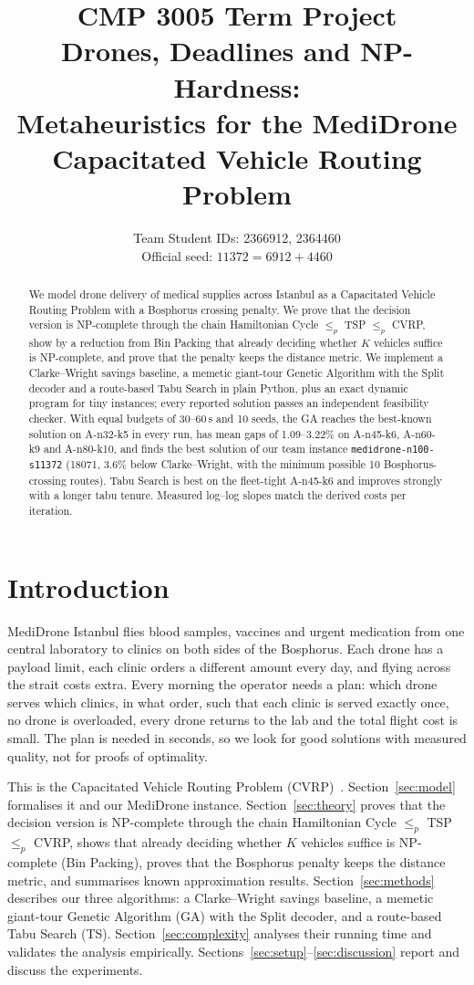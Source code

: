 \documentclass[11pt,a4paper]{article}
\title{CMP 3005 Term Project\\[2pt]
\large Drones, Deadlines and NP-Hardness:\\ Metaheuristics for the MediDrone Capacitated Vehicle Routing Problem}
\author{Team Student IDs: 2366912, 2364460\\
Official seed: $11372 = 6912 + 4460$}
\date{}
\theoremstyle{definition}
\theoremstyle{remark}
\newcommand{\code}[1]{\texttt{#1}}
\begin{document}
\maketitle

\begin{abstract}
We model drone delivery of medical supplies across Istanbul as a Capacitated Vehicle
Routing Problem with a Bosphorus crossing penalty. We prove that the decision version is
NP-complete through the chain Hamiltonian Cycle $\le_p$ TSP $\le_p$ CVRP, show by a reduction
from Bin Packing that already deciding whether $K$ vehicles suffice is NP-complete, and
prove that the penalty keeps the distance metric. We implement a Clarke--Wright savings
baseline, a memetic giant-tour Genetic Algorithm with the Split decoder and a route-based
Tabu Search in plain Python, plus an exact dynamic program for tiny instances; every
reported solution passes an independent feasibility checker. With equal budgets of
30--60\,s and 10 seeds, the GA reaches the best-known solution on A-n32-k5 in every run,
has mean gaps of 1.09--3.22\% on A-n45-k6, A-n60-k9 and A-n80-k10, and finds the best
solution of our team instance \code{medidrone-n100-s11372} (18071, 3.6\% below
Clarke--Wright, with the minimum possible 10 Bosphorus-crossing routes). Tabu Search is best
on the fleet-tight A-n45-k6 and improves strongly with a longer tabu tenure. Measured
log--log slopes match the derived costs per iteration.
\end{abstract}


\section{Introduction}
MediDrone Istanbul flies blood samples, vaccines and urgent medication from one central
laboratory to clinics on both sides of the Bosphorus. Each drone has a payload limit,
each clinic orders a different amount every day, and flying across the strait costs extra.
Every morning the operator needs a plan: which drone serves which clinics, in what order,
such that each clinic is served exactly once, no drone is overloaded, every drone returns
to the lab and the total flight cost is small. The plan is needed in seconds, so we look for
good solutions with measured quality, not for proofs of optimality.

This is the Capacitated Vehicle Routing Problem (CVRP)~\cite{toth2014}. Section~\ref{sec:model} formalises
it and our MediDrone instance. Section~\ref{sec:theory} proves that the decision version is
NP-complete through the chain Hamiltonian Cycle $\le_p$ TSP $\le_p$ CVRP, shows that already
deciding whether $K$ vehicles suffice is NP-complete (Bin Packing), proves that the
Bosphorus penalty keeps the distance metric, and summarises known approximation results.
Section~\ref{sec:methods} describes our three algorithms: a Clarke--Wright savings baseline,
a memetic giant-tour Genetic Algorithm (GA) with the Split decoder, and a route-based Tabu
Search (TS). Section~\ref{sec:complexity} analyses their running time and validates the
analysis empirically. Sections~\ref{sec:setup}--\ref{sec:discussion} report and discuss
the experiments.
\end{document}
